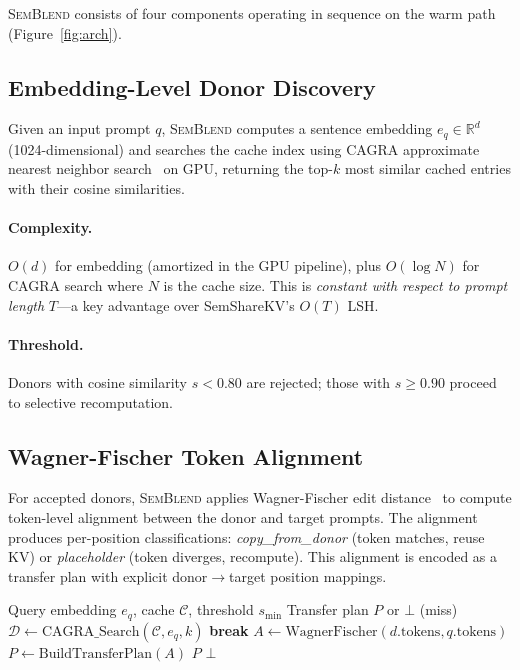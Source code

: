 \documentclass[11pt,twocolumn]{article}
\newcommand{\semblend}{\textsc{SemBlend}\xspace}
\begin{document}
\semblend consists of four components operating in sequence on the warm
path (Figure~\ref{fig:arch}).


\subsection{Embedding-Level Donor Discovery}
\label{sec:discovery}

Given an input prompt $q$, \semblend computes a sentence embedding
$e_q \in \mathbb{R}^d$ (1024-dimensional) and searches the cache index
using CAGRA approximate nearest neighbor search~\cite{cagra} on GPU,
returning the top-$k$ most similar cached entries with their cosine
similarities.

\paragraph{Complexity.} $O(d)$ for embedding (amortized in the GPU
pipeline), plus $O(\log N)$ for CAGRA search where $N$ is the cache
size. This is \emph{constant with respect to prompt length} $T$---a key
advantage over SemShareKV's $O(T)$ LSH.

\paragraph{Threshold.} Donors with cosine similarity $s < 0.80$ are
rejected; those with $s \geq 0.90$ proceed to selective recomputation.


\subsection{Wagner-Fischer Token Alignment}
\label{sec:alignment}

For accepted donors, \semblend applies Wagner-Fischer edit
distance~\cite{wagnerfischer} to compute token-level alignment between
the donor and target prompts. The alignment produces per-position
classifications: \emph{copy\_from\_donor} (token matches, reuse KV) or
\emph{placeholder} (token diverges, recompute). This alignment is
encoded as a transfer plan with explicit donor$\to$target position
mappings.

\begin{algorithm}[t]
\caption{DELTA Tree Donor Discovery}
\label{alg:delta}
\begin{algorithmic}[1]
\Require Query embedding $e_q$, cache $\mathcal{C}$, threshold $s_{\min}$
\Ensure Transfer plan $P$ or $\bot$ (miss)
\State $\mathcal{D} \gets \text{CAGRA\_Search}(\mathcal{C}, e_q, k)$
   \textbf{break} \EndIf
  \State $A \gets \text{WagnerFischer}(d.\text{tokens}, q.\text{tokens})$
  \State $P \gets \text{BuildTransferPlan}(A)$
    \State \Return $P$
  \EndIf
\EndFor
\State \Return $\bot$
\end{algorithmic}
\end{algorithm}
\end{document}
